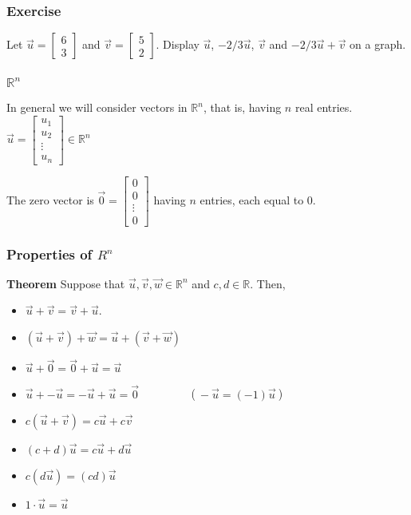 \begin{frame}[fragile]\frametitle{Exercise}

     Let $\vec{u} = \left[\begin{array}{r} 6 \\3 \end{array}\right]$
    and $\vec{v} = \left[\begin{array}{r} 5 \\2 \end{array}\right]$.  Display 
    $\vec{u}$, $-2/3\vec{u}$, $\vec{v}$ and $-2/3\vec{u} + \vec{v}$
    on a graph.
  
\end{frame}

  \begin{frame}[fragile]\frametitle{ $\mathbb R^n$}
In general we will consider vectors in $\mathbb R^n$, that is, having $n$ real entries.
$
 \vec{u} = \left[\begin{array}{r} u_1 \\ u_2\\ \vdots \\ u_n \end{array}\right] \in \mathbb R^n
$

The zero vector is $\vec{0} = \left[\begin{array}{r} 0 \\ 0 \\ \vdots \\ 0 \end{array}\right]$
having $n$ entries, each equal to $0$.
\end{frame}

  \begin{frame}[fragile]\frametitle{Properties of $R^n$}
\textbf{Theorem}  Suppose that $\vec{u}, \vec{v},\vec{w}\in \mathbb R^n$ and $c,d\in \mathbb R$.  Then,
\begin{itemize}
 \item $\vec{u} + \vec{v} = \vec{v} + \vec{u}$.
 \item $(\vec{u} + \vec{v} ) + \vec{w} = 
        \vec{u} + ( \vec{v} + \vec{w})$
 \item $\vec{u} + \vec{0} = \vec{0} +\vec{u} = \vec{u}$
 \item $\vec{u} + -\vec{u} = -\vec{u}+ \vec{u} = \vec{0}$
 $\qquad \qquad$ ($\ -\vec{u} = (-1)\vec{u}\ $)
 \item $c(\vec{u} + \vec{v} ) = c\vec{u} + c\vec{v}$
 \item $(c+d)\vec{u} = c\vec{u} + d\vec{u}$
 \item $c(d\vec{u}) = (cd)\vec{u}$
 \item $1 \cdot \vec{u} =\vec{u}$
\end{itemize}


\end{frame}
